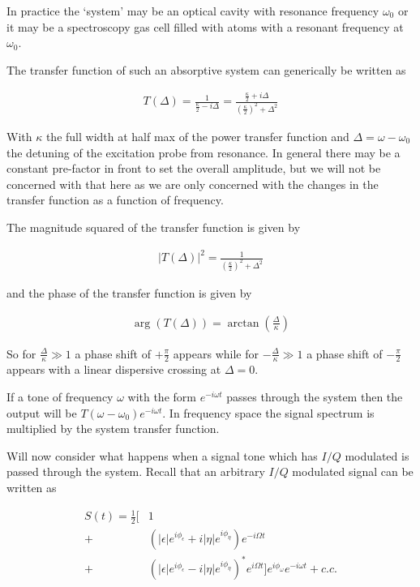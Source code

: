 \documentclass[12pt]{article}
\newcommand{\ep}{\epsilon}
\begin{document}
In practice the `system' may be an optical cavity with resonance frequency $\omega_0$ or it may be a spectroscopy gas cell filled with atoms with a resonant frequency at $\omega_0$.

The transfer function of such an absorptive system can generically be written as 

\begin{align}
T(\Delta) = \frac{1}{\frac{\kappa}{2} - i\Delta} = \frac{\frac{\kappa}{2} + i\Delta}{\left(\frac{\kappa}{2}\right)^2 + \Delta^2}
\end{align}

With $\kappa$ the full width at half max of the power transfer function and $\Delta = \omega - \omega_0$ the detuning of the excitation probe from resonance. In general there may be a constant pre-factor in front to set the overall amplitude, but we will not be concerned with that here as we are only concerned with the changes in the transfer function as a function of frequency.

The magnitude squared of the transfer function is given by

\begin{align}
|T(\Delta)|^2 = \frac{1}{\left(\frac{\kappa}{2}\right)^2 + \Delta^2}
\end{align}

and the phase of the transfer function is given by

\begin{align}
\arg(T(\Delta)) = \arctan\left(\frac{\Delta}{\kappa}\right)
\end{align}

So for $\frac{\Delta}{\kappa} \gg 1$ a phase shift of $+\frac{\pi}{2}$ appears while for $-\frac{\Delta}{\kappa} \gg 1$ a phase shift of $-\frac{\pi}{2}$ appears with a linear dispersive crossing at $\Delta = 0$.

If a tone of frequency $\omega$ with the form $e^{-i\omega t}$ passes through the system then the output will be $T(\omega - \omega_0)e^{-i\omega t}$. In frequency space the signal spectrum is multiplied by the system transfer function.

Will now consider what happens when a signal tone which has $I/Q$ modulated is passed through the system. Recall that an arbitrary $I/Q$ modulated signal can be written as

\begin{align}
S(t) = \frac{1}{2}\Bigg[&1\\
+&(|\ep|e^{i\phi_{\ep}} + i|\eta|e^{i\phi_{\eta}})e^{-i\Omega t}\\
+&(|\ep|e^{i\phi_{\ep}} - i|\eta|e^{i\phi_{\eta}})^*e^{i\Omega t}\Bigg]e^{i\phi_{\omega}}e^{-i\omega t} + c.c.
\end{align}
\end{document}
